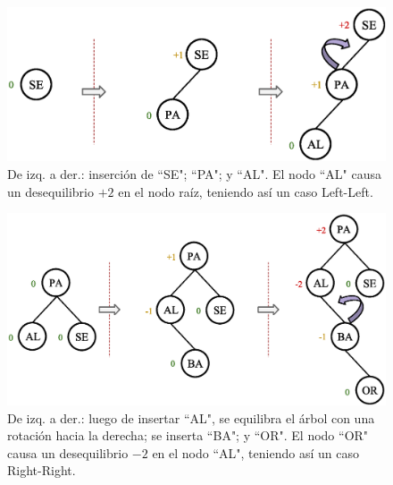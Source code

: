 \begin{figure}[htpb!]
  \begin{center}
    \includegraphics[width=1.0\textwidth]{images/AVLInsertion1.eps}
  \end{center}
  \caption{De izq. a der.: inserción de ``SE"; ``PA"; y ``AL". El nodo ``AL" causa un desequilibrio $+2$ en el nodo raíz, teniendo así un caso Left-Left.}
  \label{fig:AVLInsertion1}
\end{figure}

\begin{figure}[htpb!]
  \begin{center}
    \includegraphics[width=1.0\textwidth]{images/AVLInsertion2.eps}
  \end{center}
  \caption{De izq. a der.: luego de insertar ``AL", se equilibra el árbol con una rotación hacia la derecha; se inserta ``BA"; y ``OR". El nodo ``OR" causa un desequilibrio $-2$ en el nodo ``AL", teniendo así un caso Right-Right.}
  \label{fig:AVLInsertion2}
\end{figure}

